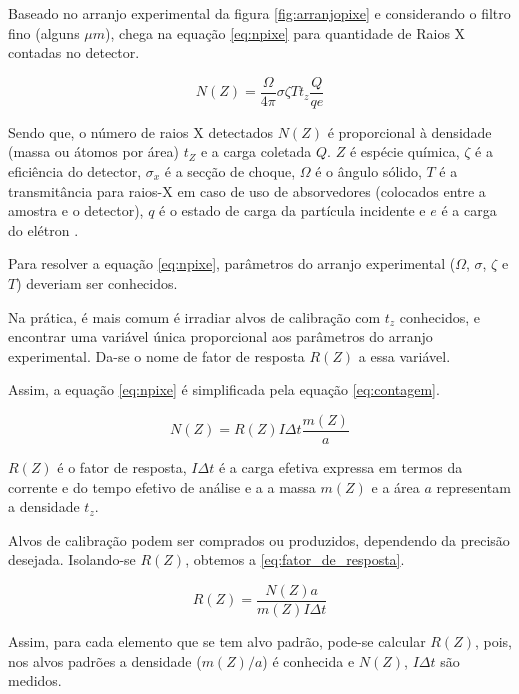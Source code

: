 Baseado no arranjo experimental da figura \ref{fig:arranjopixe} e
considerando o filtro fino (alguns $\mu m$),
\cite{tabacniks2000} chega na equação \ref{eq:npixe} para quantidade de Raios X
contadas no detector. 

\begin{equation}
  \label{eq:npixe}
  N(Z) = \frac{\Omega}{4\pi} \sigma \zeta T t_z \frac{Q}{qe}
\end{equation}

Sendo que, o número de raios X detectados $N(Z)$ é proporcional à 
densidade (massa ou átomos por área) $t_Z$ e a carga coletada $Q$.
$Z$ é espécie química, $\zeta$ é a eficiência do detector, 
$\sigma_x$ é a secção de choque, $\Omega$ é o ângulo sólido, 
$T$ é a transmitância para raios-X em caso de uso de absorvedores 
(colocados entre a amostra e o detector), $q$ é o estado de carga da 
partícula incidente e $e$ é a carga do elétron \cite{tabacniks1983}.

Para resolver a equação \ref{eq:npixe}, parâmetros do arranjo experimental
($\Omega$, $\sigma$, $\zeta$ e $T$) deveriam ser conhecidos. 

Na prática, é mais comum é irradiar alvos de calibração com $t_z$ conhecidos,
e encontrar uma variável única proporcional aos parâmetros do arranjo experimental.
Da-se o nome de fator de resposta $R(Z)$ a essa variável.

Assim, a equação \ref{eq:npixe} é simplificada pela equação \ref{eq:contagem}.

\begin{equation}
  \label{eq:contagem}
  N(Z) = R(Z) I\Delta t \frac{m(Z)}{a}
\end{equation}

$R(Z)$ é o fator de resposta, $I\Delta t$ é a carga efetiva expressa
em termos da corrente e do tempo efetivo de análise e a 
a massa $m(Z)$ e a área $a$ representam a densidade $t_z$. 

Alvos de calibração podem ser comprados ou produzidos, dependendo da 
precisão desejada. Isolando-se $R(Z)$, obtemos a \ref{eq:fator_de_resposta}.

\begin{equation}
  \label{eq:fator_de_resposta}
  R(Z) = \frac{N(Z) a}{m(Z)I \Delta t}
\end{equation}

Assim, para cada elemento que se tem alvo padrão, pode-se calcular $R(Z)$,
pois, nos alvos padrões a densidade ($m(Z)/a$) é conhecida e $N(Z)$, $I \Delta t$ são medidos. 

